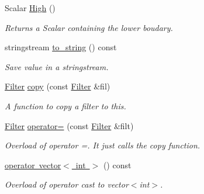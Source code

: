 \begin{DoxyCompactItemize}
Scalar \mbox{\hyperlink{class_filter_a448a83071e9f33c39ba09ac139a8af31}{High}} ()
\begin{DoxyCompactList}\small\item\em Returns a Scalar containing the lower boudary. \end{DoxyCompactList}\item 
stringstream \mbox{\hyperlink{class_filter_aba04694e9b16e23fb27f7ae730c9038f}{to\+\_\+string}} () const
\begin{DoxyCompactList}\small\item\em Save value in a stringstream. \end{DoxyCompactList}\item 
\mbox{\hyperlink{class_filter}{Filter}} \mbox{\hyperlink{class_filter_a54ac470a139c2389861241cdb3cd8cc9}{copy}} (const \mbox{\hyperlink{class_filter}{Filter}} \&fil)
\begin{DoxyCompactList}\small\item\em A function to copy a filter to this. \end{DoxyCompactList}\item 
\mbox{\hyperlink{class_filter}{Filter}} \mbox{\hyperlink{class_filter_ad662158aa60a9a938d94fd45df5a6cd5}{operator=}} (const \mbox{\hyperlink{class_filter}{Filter}} \&filt)
\begin{DoxyCompactList}\small\item\em Overload of operator =. It just calls the copy function. \end{DoxyCompactList}\item 
\mbox{\hyperlink{class_filter_a147633122e621d3052b385237d8f7b6b}{operator vector$<$ int $>$}} () const
\begin{DoxyCompactList}\small\item\em Overload of operator cast to vector$<$int$>$. \end{DoxyCompactList}\end{DoxyCompactItemize}
